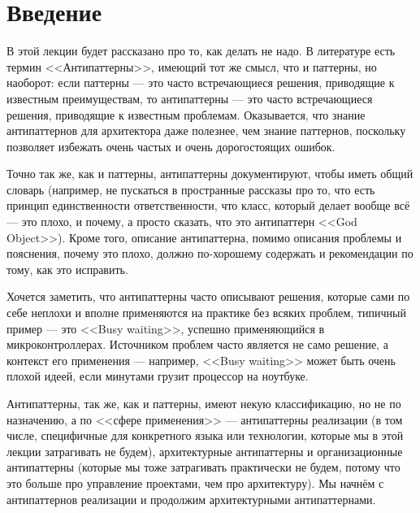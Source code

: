 \documentclass{../../text-style}
\begin{document}
\maketitle
\thispagestyle{empty}

\section{Введение}

В этой лекции будет рассказано про то, как делать не надо. В литературе есть термин <<Антипаттерны>>, имеющий тот же смысл, что и паттерны, но наоборот: если паттерны --- это часто встречающиеся решения, приводящие к известным преимуществам, то антипаттерны --- это часто встречающиеся решения, приводящие к известным проблемам. Оказывается, что знание антипаттернов для архитектора даже полезнее, чем знание паттернов, поскольку позволяет избежать очень частых и очень дорогостоящих ошибок.

Точно так же, как и паттерны, антипаттерны документируют, чтобы иметь общий словарь (например, не пускаться в пространные рассказы про то, что есть принцип единственности ответственности, что класс, который делает вообще всё --- это плохо, и почему, а просто сказать, что это антипаттерн <<God Object>>). Кроме того, описание антипаттерна, помимо описания проблемы и пояснения, почему это плохо, должно по-хорошему содержать и рекомендации по тому, как это исправить. 

Хочется заметить, что антипаттерны часто описывают решения, которые сами по себе неплохи и вполне применяются на практике без всяких проблем, типичный пример --- это <<Busy waiting>>, успешно применяющийся в микроконтроллерах. Источником проблем часто является не само решение, а контекст его применения --- например, <<Busy waiting>> может быть очень плохой идеей, если минутами грузит процессор на ноутбуке.

Антипаттерны, так же, как и паттерны, имеют некую классификацию, но не по назначению, а по <<сфере применения>> --- антипаттерны реализации (в том числе, специфичные для конкретного языка или технологии, которые мы в этой лекции затрагивать не будем), архитектурные антипаттерны и организационные антипаттерны (которые мы тоже затрагивать практически не будем, потому что это больше про управление проектами, чем про архитектуру). Мы начнём с антипаттернов реализации и продолжим архитектурными антипаттернами.
\end{document}
